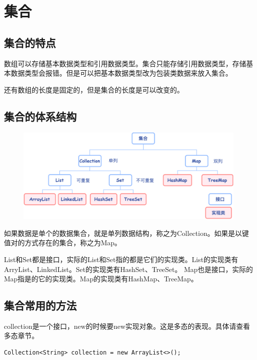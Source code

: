 \section*{集合}\label{sec:Collection}


\subsection*{集合的特点}
数组可以存储基本数据类型和引用数据类型。集合只能存储引用数据类型，存储基本数据类型会报错。但是可以把基本数据类型改为包装类数据来放入集合。


还有数组的长度是固定的，但是集合的长度是可以改变的。

\subsection*{集合的体系结构}

\begin{figure}
    \centering
    \includegraphics[width=.7\textwidth]{img/collection/1.png}
\end{figure}



如果数据是单个的数据集合，就是单列数据结构，称之为Collection。如果是以键值对的方式存在的集合，称之为Map。

List和Set都是接口，实际的List和Set指的都是它们的实现类。List的实现类有ArryList、LinkedList。Set的实现类有HashSet、TreeSet。
Map也是接口，实际的Map指是的它的实现类。Map的实现类有HashMap、TreeMap。

\subsection*{集合常用的方法}
collection是一个接口，new的时候要new实现对象。这是多态的表现。具体请查看多态章节。
\begin{lstlisting}[style=Java]
Collection<String> collection = new ArrayList<>();
\end{lstlisting}

